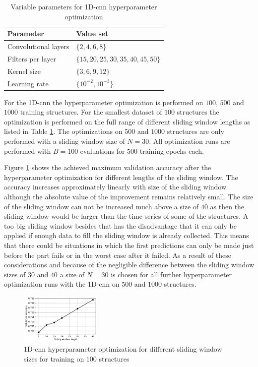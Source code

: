 \documentclass[conference]{IEEEtran}
\begin{document}
\begin{table}[htp]
	\centering
	\caption{Variable parameters for 1D-\gls{cnn} hyperparameter optimization}
	\label{tab:variable_parameters_cnn_optimization}
	\begin{tabular}{ll}
		\textbf{Parameter} & \textbf{Value set} \\
		\hline
		Convolutional layers & $ \{2, 4, 6, 8\} $ \\
		Filters per layer & $ \{15, 20, 25, 30, 35, 40, 45, 50\} $ \\
		Kernel size & $ \{3, 6, 9, 12\} $ \\
		Learning rate & $ \{10^{-2}, 10^{-3}\} $
	\end{tabular}
\end{table}

For the 1D-\gls{cnn} the hyperparameter optimization is performed on $ 100 $, $ 500 $ and $ 1000 $  training structures. For the smallest dataset of $ 100 $ structures the optimization is performed on the full range of different sliding window lengths as listed in Table \ref{tab:variable_parameters_cnn_optimization}. The optimizations on $ 500 $ and $ 1000 $ structures are only performed with a sliding window size of $ N = 30 $. All optimization runs are performed with $ B = 100 $ evaluations for $ 500 $ training epochs each.

Figure \ref{fig:influence_sequence_length_cnn} shows the achieved maximum validation accuracy after the hyperparameter optimization for different lengths of the sliding window. The accuracy increases approximately linearly with size of the sliding window although the absolute value of the improvement remains relatively small. The size of the sliding window can not be increased much above a size of $ 40 $ as then the sliding window would be larger than the time series of some of the structures. A too big sliding window besides that has the disadvantage that it can only be applied if enough data to fill the sliding window is already collected. This means that there could be situations in which the first predictions can only be made just before the part fails or in the worst case after it failed. As a result of these considerations and because of the negligible difference between the sliding window sizes of $ 30 $ and $ 40 $ a size of $ N = 30 $ is chosen for all further hyperparameter optimization runs with the 1D-\gls{cnn} on $ 500 $ and $ 1000 $ structures.

\begin{figure}[htp]
	\centering
	\includegraphics[width=0.35\textwidth]{python/influence_sequence_length_cnn.pdf}
	\caption{1D-\gls{cnn} hyperparameter optimization for different sliding window sizes for training on $ 100 $ structures}
	\label{fig:influence_sequence_length_cnn}
\end{figure}
\end{document}
